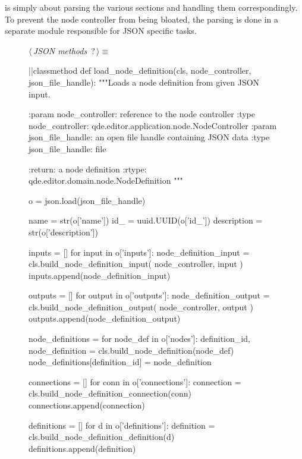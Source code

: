 \documentclass[%
    a4paper,    %
    justified,  %
    nobib,      %
    openany     %
]{tufte-book}
\begin{document}
 is simply about parsing the various
sections and handling them correspondingly. To prevent the node controller from
being bloated, the parsing is done in a separate module responsible for JSON
specific tasks.

\begin{figure}
\begin{flushleft} \small
\begin{minipage}{\linewidth}\label{scrap126}\raggedright\small
{} $\langle\,${\itshape JSON methods}\nobreak\ {\footnotesize {?}}$\,\rangle\equiv$
\vspace{-1ex}
\begin{pythoncode}
|\normalfont{}\fontfamily{}|classmethod
def load_node_definition(cls, node_controller, json_file_handle):
    """Loads a node definition from given JSON input.

    :param node_controller: reference to the node controller
    :type node_controller: qde.editor.application.node.NodeController
    :param json_file_handle: an open file handle containing JSON data
    :type json_file_handle: file

    :return: a node definition
    :rtype: qde.editor.domain.node.NodeDefinition
    """

    o = json.load(json_file_handle)

    name        = str(o['name'])
    id_         = uuid.UUID(o['id_'])
    description = str(o['description'])

    inputs = []
    for input in o['inputs']:
        node_definition_input = cls.build_node_definition_input(
            node_controller, input
        )
        inputs.append(node_definition_input)

    outputs = []
    for output in o['outputs']:
        node_definition_output = cls.build_node_definition_output(
            node_controller, output
        )
        outputs.append(node_definition_output)

    node_definitions = {}
    for node_def in o['nodes']:
        definition_id, node_definition = cls.build_node_definition(node_def)
        node_definitions[definition_id] = node_definition

    connections = []
    for conn in o['connections']:
        connection = cls.build_node_definition_connection(conn)
        connections.append(connection)

    definitions = []
    for d in o['definitions']:
        definition = cls.build_node_definition_definition(d)
        definitions.append(definition)


\end{pythoncode}
\end{minipage}
\end{flushleft}
\end{figure}
\end{document}
